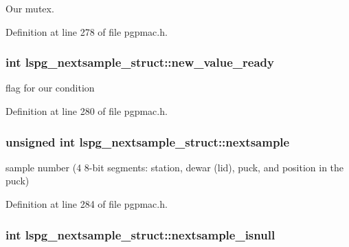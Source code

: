 Our mutex. 



Definition at line 278 of file pgpmac.\-h.

\hypertarget{structlspg__nextsample__struct_ab1c9e9d3dc5140137a7ccf908e95f69e}{
\subsubsection[{new\-\_\-value\-\_\-ready}]{\setlength{\rightskip}{0pt plus 5cm}int lspg\-\_\-nextsample\-\_\-struct\-::new\-\_\-value\-\_\-ready}}\label{structlspg__nextsample__struct_ab1c9e9d3dc5140137a7ccf908e95f69e}


flag for our condition 



Definition at line 280 of file pgpmac.\-h.

\hypertarget{structlspg__nextsample__struct_aecd82b329462ae06bc2f0d162985a086}{
\subsubsection[{nextsample}]{\setlength{\rightskip}{0pt plus 5cm}unsigned int lspg\-\_\-nextsample\-\_\-struct\-::nextsample}}\label{structlspg__nextsample__struct_aecd82b329462ae06bc2f0d162985a086}


sample number (4 8-\/bit segments\-: station, dewar (lid), puck, and position in the puck) 



Definition at line 284 of file pgpmac.\-h.

\hypertarget{structlspg__nextsample__struct_a2ca6e2a667c9fe7f1a54329de04d2a3c}{
\subsubsection[{nextsample\-\_\-isnull}]{\setlength{\rightskip}{0pt plus 5cm}int lspg\-\_\-nextsample\-\_\-struct\-::nextsample\-\_\-isnull}}\label{structlspg__nextsample__struct_a2ca6e2a667c9fe7f1a54329de04d2a3c}


